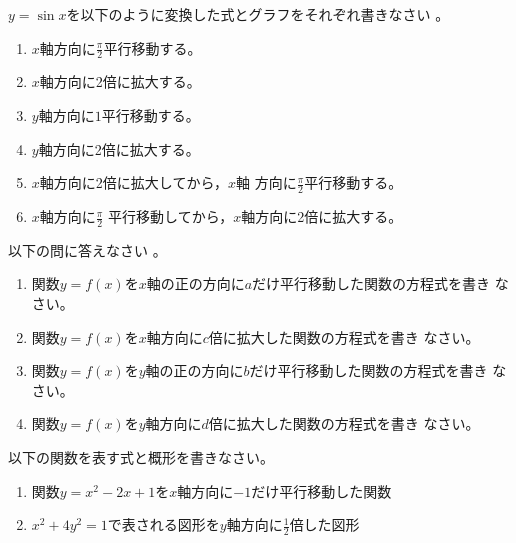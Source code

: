 \documentclass[twocolumn,11pt]{jarticle}
\begin{document}
\nquestion
$y=\sin x$を以下のように変換した式とグラフをそれぞれ書きなさい
。
\begin{enumerate}
\item\label{item:MoveSin} $x$軸方向に$\displaystyle\frac{\pi}{2}$平行移動する。
\item\label{item:StretchSin} $x$軸方向に2倍に拡大する。
\item\label{item:MoveSinY} $y$軸方向に$1$平行移動する。
\item\label{item:StretchSinY} $y$軸方向に2倍に拡大する。
\item\label{itme:StretchMove} $x$軸方向に2倍に拡大してから，$x$軸
  方向に$\displaystyle\frac{\pi}{2}$平行移動する。
\item\label{item:MoveStretch} $x$軸方向に$\displaystyle\frac{\pi}{2}$
  平行移動してから，$x$軸方向に2倍に拡大する。
\end{enumerate}

\nquestion 以下の問に答えなさい
。
\begin{enumerate}
\item\label{item:MoveX}
 関数$y=f(x)$を$x$軸の正の方向に$a$だけ平行移動した関数の方程式を書き
  なさい。
\item\label{item:StretchX}
  関数$y=f(x)$を$x$軸方向に$c$倍に拡大した関数の方程式を書き
  なさい。
\item\label{item:MoveY}
  関数$y=f(x)$を$y$軸の正の方向に$b$だけ平行移動した関数の方程式を書き
  なさい。
\item\label{item:StretchY}
 関数$y=f(x)$を$y$軸方向に$d$倍に拡大した関数の方程式を書き
  なさい。
\end{enumerate}

\nquestion
以下の関数を表す式と概形を書きなさい。
\begin{enumerate}
\item 関数$y=x^2-2x+1$を$x$軸方向に$-1$だけ平行移動した関数
\item $x^2+4y^2=1$で表される図形を$y$軸方向に$\frac{1}{2}$倍した図形
\end{enumerate}
\end{document}
